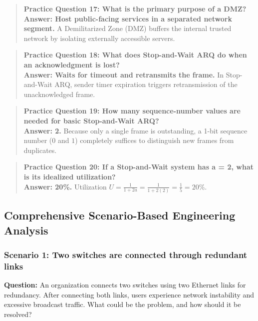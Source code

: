 \begin{quote}
\textbf{Practice Question 17: What is the primary purpose of a DMZ?}\\[4pt]
\vspace{4pt}
\textbf{Answer: Host public-facing services in a separated network segment.} A Demilitarized Zone (DMZ) buffers the internal trusted network by isolating externally accessible servers.
\end{quote}
\begin{quote}
\textbf{Practice Question 18: What does Stop-and-Wait ARQ do when an acknowledgment is lost?}\\[4pt]
\vspace{4pt}
\textbf{Answer: Waits for timeout and retransmits the frame.} In Stop-and-Wait ARQ, sender timer expiration triggers retransmission of the unacknowledged frame.
\end{quote}
\begin{quote}
\textbf{Practice Question 19: How many sequence-number values are needed for basic Stop-and-Wait ARQ?}\\[4pt]
\vspace{4pt}
\textbf{Answer: 2.} Because only a single frame is outstanding, a 1-bit sequence number ($0$ and $1$) completely suffices to distinguish new frames from duplicates.
\end{quote}
\begin{quote}
\textbf{Practice Question 20: If a Stop-and-Wait system has a = 2, what is its idealized utilization?}\\[4pt]
\vspace{4pt}
\textbf{Answer: 20\%.} Utilization $U = \frac{1}{1 + 2a} = \frac{1}{1 + 2(2)} = \frac{1}{5} = 20\%$.
\end{quote}

\subsection{Comprehensive Scenario-Based Engineering Analysis}
\subsubsection*{Scenario 1: Two switches are connected through redundant links}

\textbf{Question:} An organization connects two switches using two Ethernet links for redundancy. After connecting both links, users experience network instability and excessive broadcast traffic. What could be the problem, and how should it be resolved?

